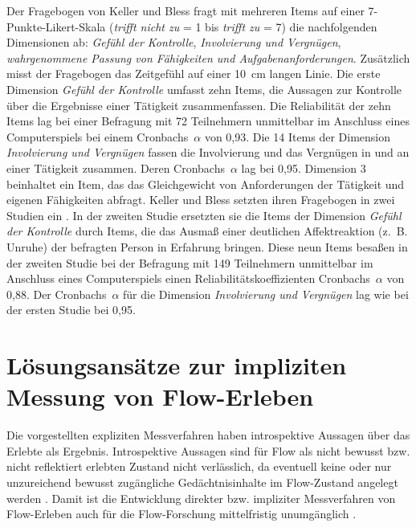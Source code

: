 Der Fragebogen von Keller und Bless fragt mit mehreren Items auf einer 7-Punkte-Likert-Skala (\emph{trifft nicht zu} = 1 bis \emph{trifft zu} = 7) die nachfolgenden Dimensionen ab: \emph{Gefühl der Kontrolle}, \emph{Involvierung und Vergnügen}, \emph{wahrgenommene Passung von Fähigkeiten und Aufgabenanforderungen}. Zusätzlich misst der Fragebogen das Zeitgefühl auf einer 10~cm langen Linie. Die erste Dimension \emph{Gefühl der Kontrolle} umfasst zehn Items, die Aussagen zur Kontrolle über die Ergebnisse einer Tätigkeit zusammenfassen. Die Reliabilität der zehn Items lag bei einer Befragung mit 72 Teilnehmern unmittelbar im Anschluss eines Computerspiels bei einem Cronbachs~$\alpha$ von 0,93. Die 14 Items der Dimension \emph{Involvierung und Vergnügen} fassen die Involvierung und das Vergnügen in und an einer Tätigkeit zusammen. Deren Cronbachs~$\alpha$ lag bei 0,95. Dimension 3 beinhaltet ein Item, das das Gleichgewicht von Anforderungen der Tätigkeit und eigenen Fähigkeiten abfragt. Keller und Bless setzten ihren Fragebogen in zwei Studien ein \citep{Keller2008}. In der zweiten Studie ersetzten sie die Items der Dimension \emph{Gefühl der Kontrolle} durch Items, die das Ausmaß einer deutlichen Affektreaktion (z.~B. Unruhe) der befragten Person in Erfahrung bringen. Diese neun Items besaßen in der zweiten Studie bei der Befragung mit 149 Teilnehmern unmittelbar im Anschluss eines Computerspiels einen Reliabilitätskoeffizienten Cronbachs~$\alpha$ von 0,88. Der Cronbachs~$\alpha$ für die Dimension \emph{Involvierung und Vergnügen} lag wie bei der ersten Studie bei 0,95.




\section{Lösungsansätze zur impliziten Messung von Flow-Erleben} %
\label{sec:losungsansatze_zur_impliziten_messung_von_flow_erleben}

Die vorgestellten expliziten Messverfahren haben introspektive Aussagen über das Erlebte als Ergebnis. Introspektive Aussagen sind für Flow als nicht bewusst bzw. nicht reflektiert erlebten Zustand nicht verlässlich, da eventuell keine oder nur unzureichend bewusst zugängliche Gedächtnisinhalte im Flow-Zustand angelegt werden \citep[][S.~82]{Henk2014}. Damit ist die Entwicklung direkter bzw. impliziter Messverfahren von Flow-Erleben auch für die Flow-Forschung mittelfristig unumgänglich \citep[][S.~86]{Henk2014}.

